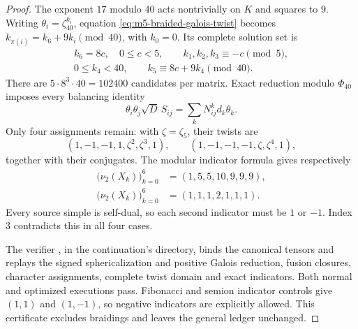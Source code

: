 \begin{proof}
The exponent $17$ modulo $40$ acts nontrivially on $K$ and squares
to $9$.  Writing $\theta_i=\zeta_{40}^{k_i}$, equation
\eqref{eq:m5-braided-galois-twist} becomes
$k_{\pi(i)}=k_6+9k_i\pmod{40}$, with $k_0=0$.
Its complete solution set is
\[
 \begin{gathered}
 k_6=8c,\quad 0\leq c<5,\qquad
 k_1,k_2,k_3\equiv-c\pmod5,\\
 0\leq k_4<40,\qquad k_5\equiv8c+9k_4\pmod{40}.
 \end{gathered}
\]
There are $5\cdot8^3\cdot40=102400$ candidates per matrix.
Exact reduction modulo $\Phi_{40}$ imposes every balancing identity
\[
 \theta_i\theta_j\sqrt D\,S_{ij}
       =\sum_kN_{ij}^k d_k\theta_k.
\]
Only four assignments remain: with $\zeta=\zeta_5$, their twists are
\[
 (1,-1,-1,1,\zeta^2,\zeta^3,1),\qquad
 (1,-1,-1,-1,\zeta,\zeta^4,1),
\]
together with their conjugates.
The modular indicator formula
\cite[Theorem~7.5]{NgSchauenburgExponent} gives respectively
\[
 \begin{split}
 \bigl(\nu_2(X_k)\bigr)_{k=0}^6&=(1,5,5,10,9,9,9),\\
 \bigl(\nu_2(X_k)\bigr)_{k=0}^6&=(1,1,1,2,1,1,1).
 \end{split}
\]
Every source simple is self-dual, so each second indicator must be
$1$ or $-1$.  Index $3$ contradicts this in all four cases.

The verifier , in the continuation's
 directory, binds the canonical tensors and
replays the signed sphericalization and positive Galois reduction,
fusion closures, character assignments, complete twist domain and
exact indicators.  Both normal and optimized executions pass.
Fibonacci and semion indicator controls give $(1,1)$ and $(1,-1)$,
so negative indicators are explicitly allowed.  This certificate
excludes braidings and leaves the general ledger unchanged.
\end{proof}
